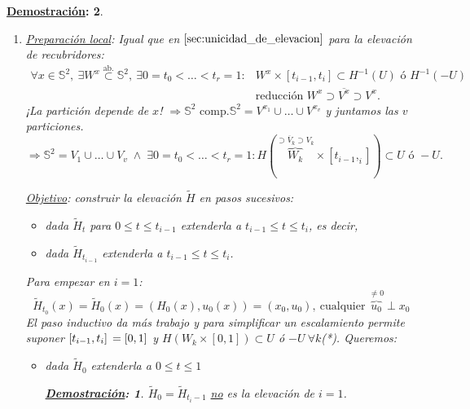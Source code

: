 \documentclass[10pt,a4paper,openright]{book}
\theoremstyle{break}
\newtheorem*{demo}{\underline{Demostración}:}
\begin{document}
\begin{demo}
\begin{enumerate}
    En $-U : x_3\neq -1$ igual con $\eta\left( x \right) = \left( 1 + x_3 - x_1^2, -x_1x_2, -x_1\left( 1 + x_3 \right) \right)$.

    \item \underline{Preparación local}: Igual que en $\ref{sec:unicidad_de_elevacion}$ para la elevación de recubridores:
    \begin{align*}
        \forall x \in \mathbb{S}^{2},\ \exists W^x \stackrel{\text{ab.}}{\subset} \mathbb{S}^{2},\ \exists 0 = t_0 < \ldots < t_r = 1 : &W^x \times \left[ t_{i - 1}, t_i \right] \subset H^{-1}\left( U \right) \text{ ó } H^{-1}\left( -U \right)\\
        &\text{reducción } W^x \supset \overline{V^x} \supset V^x
    .\end{align*}
    ¡La partición depende de $x$! $\Rightarrow{\mathbb{S}^{2}\text{ comp.}} \mathbb{S}^{2} = V^{x_1} \cup \ldots \cup V^{x_v}$ y juntamos las $v$ particiones.
    \[
    \Rightarrow \mathbb{S}^{2} = V_1 \cup \ldots \cup V_v\; \land \;\exists 0 = t_0 < \ldots < t_r = 1: H\left( \overbrace{W_k}^{\supset \overline{V}_k \supset V_k} \times \left[ t_{i - 1}, _i \right] \right) \subset U \text{ ó } -U.
    \]

    \underline{Objetivo}: construir la elevación $\tilde{H}$ en pasos sucesivos: 
    \begin{itemize}
        \item dada $\tilde{H}_t$ para $0 \le t \le t_{i-1}$ extenderla a $t_{i - 1} \le t \le t_i$, es decir, 
        \item dada $\tilde{H}_{t_{i - 1}}$ extenderla a $t_{i - 1} \le t \le t_i$.
    \end{itemize}
    Para empezar en $i = 1$: 
    \[
    \tilde{H}_{t_0} \left( x \right) = \tilde{H}_0\left( x \right) = \left( H_0\left( x \right), u_0\left( x \right) \right) = \left( x_0, u_0 \right),\ \text{cualquier } \overbrace{u_0}^{\neq 0} \perp x_0
    \]
    El paso inductivo da más trabajo y para simplificar un escalamiento permite suponer $\left[ t_{i - 1}, t_i \right]\\ = \left[ 0, 1 \right]$ y $H\left( W_k \times \left[ 0, 1 \right] \right) \subset U$ ó $-U\ \forall k$(*). Queremos:
    \begin{itemize}
        \item dada $\tilde{H}_0$ extenderla a $0 \le t \le 1$
        \begin{demo}
            $\tilde{H}_0 = \tilde{H}_{t_i - 1}$ \underline{no} es la elevación de $i = 1$. 
        \end{demo}
    \end{itemize}


\end{enumerate}
\end{demo}
\end{document}
